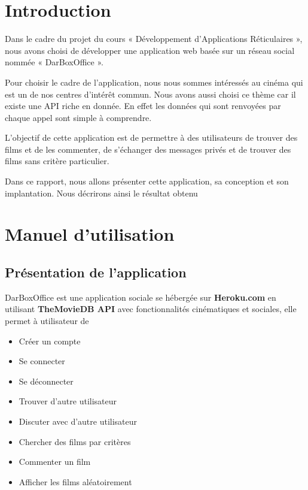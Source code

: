 \documentclass[12pt]{article}
\begin{document}

\tableofcontents
\pagebreak

\newpage
\section{Introduction}


Dans le cadre du projet du cours « Développement d’Applications Réticulaires », nous avons choisi de développer une application web basée sur un réseau social nommée « DarBoxOffice ».

Pour choisir le cadre de l’application, nous nous sommes intéressés au cinéma qui est un de nos centres d’intérêt commun. Nous avons aussi choisi ce thème car il existe une API riche en donnée.
En effet les données qui sont renvoyées par chaque appel  sont simple à comprendre.

L’objectif de cette application est de permettre à des utilisateurs de trouver des films et de les commenter, de s’échanger des messages privés et de trouver des films sans critère particulier.

Dans ce rapport, nous allons présenter cette application, sa conception et son implantation. Nous décrirons ainsi le résultat obtenu

\newpage
\section{Manuel d'utilisation}

\subsection{Présentation de l'application}
DarBoxOffice est une application sociale se hébergée sur \textbf{Heroku.com} en utilisant \textbf{TheMovieDB API} avec fonctionnalités cinématiques et sociales, elle permet à utilisateur de \begin{itemize}
    \item Créer un compte
    \item Se connecter
    \item Se déconnecter
    \item Trouver d'autre utilisateur
    \item Discuter avec d'autre utilisateur
    \item Chercher des films par critères
    \item Commenter un film
    \item Afficher les films aléatoirement
\end{itemize}
\end{document}
